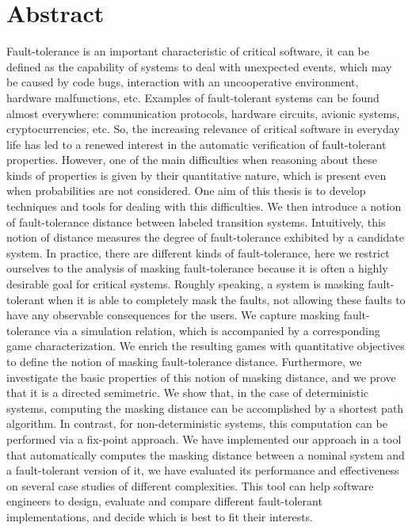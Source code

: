 \chapter*{Abstract}

Fault-tolerance is an important characteristic of critical software, it can be defined as the  capability of systems  
to deal with unexpected events, which may be caused by code bugs, interaction with an uncooperative environment, 
hardware malfunctions, etc.
Examples of fault-tolerant systems can be found  almost everywhere:
communication protocols, hardware circuits, avionic systems, 
cryptocurrencies, etc. 
So, the increasing relevance of critical software in  
everyday life  has led to a renewed interest  in the automatic 
verification of fault-tolerant properties. However, one of the main 
difficulties when reasoning about these kinds of properties is given 
by their quantitative nature, which is present even when probabilities are not considered.
One aim of this thesis is to develop techniques and tools for dealing with this difficulties.
We then introduce a notion of fault-tolerance distance between 
labeled transition systems. Intuitively, this notion of distance measures the degree of fault-tolerance exhibited by a candidate system.
In practice, there are different kinds of fault-tolerance, here we restrict ourselves to the analysis of
masking fault-tolerance because it is often a highly desirable goal for critical systems. 
Roughly speaking, a system is masking fault-tolerant when it is able to completely mask the faults, 
not allowing these faults to have any observable consequences for the users.  
We capture masking fault-tolerance via a simulation relation, which is accompanied  by a corresponding  game characterization. 
We enrich the resulting games with quantitative objectives to 
define the notion of masking fault-tolerance distance.
Furthermore, we investigate the basic properties of this notion of masking distance, and 
we prove that it is a directed semimetric. 
We show that, in the case of deterministic systems, computing the  
masking distance can be accomplished by a shortest path algorithm. 
In contrast, for non-deterministic systems, this computation can be performed via a fix-point approach.
We have implemented our approach in a tool that automatically computes the masking distance between a nominal system and a fault-tolerant version of it, we have evaluated its performance and effectiveness on several case studies of different complexities.
This tool can help software engineers to design, evaluate and compare different fault-tolerant implementations, and decide which is best to fit their interests.

